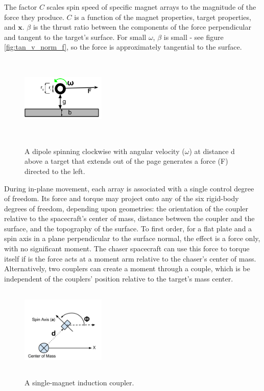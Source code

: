 The factor $C$ scales spin speed of specific magnet arrays to the magnitude of the force they produce. $C$ is a function of the magnet properties, target properties, and $\boldsymbol{x}$. $\beta$ is the thrust ratio between the components of the force perpendicular and tangent to the target's surface. For small $\omega$, $\beta$ is small - see figure \ref{fig:tan_v_norm_f}, so the force is approximately tangential to the surface.

\begin{figure}
\includegraphics[width = 4cm, height = 4cm ]{figures/force_diagram.png}
\label{fig:arry_force_diagram}
\caption{A dipole spinning clockwise with angular velocity ($\omega$) at distance d above a target that extends out of the page generates a force (F) directed to the left.}
\end{figure}

During in-plane movement, each array is associated with a single control degree of freedom. Its force and torque may project onto any of the six rigid-body degrees of freedom, depending upon geometries: the orientation of the coupler relative to the spacecraft’s ‎center ‎of ‎mass, ‎distance between the coupler and the surface, and the topography of the surface. To first order, for a flat plate and a spin axis in a plane perpendicular to the surface normal, the effect is a force only, with no significant moment. The chaser spacecraft can use this force to torque itself if is the force acts at a moment arm relative to the chaser’s center of mass. Alternatively, two couplers can create a moment through a couple, which is be independent of‎ the‎ couplers’‎ position relative to‎ the‎ target’s‎ mass‎ center.


\begin{figure}
\includegraphics[width = 4cm, height = 4cm ]{figures/minimum_array.png}
\label{fig:min_array_diagram}
\caption{A single-magnet induction coupler.}
\end{figure}

